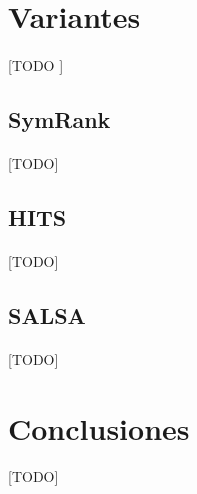 \documentclass{subfiles}
\begin{document}
    \section{Variantes}
    \label{sec:pagerank_variants}

      \paragraph{}
      [TODO ]

      \subsection{SymRank}
      \label{sec:symrank}

        \paragraph{}
        [TODO]

      \subsection{HITS}
      \label{sec:hits}

        \paragraph{}
        [TODO]

      \subsection{SALSA}
      \label{sec:salsa}

        \paragraph{}
        [TODO]

    \section{Conclusiones}
    \label{sec:pagerank_conclusions}

      \paragraph{}
      [TODO]
\end{document}
